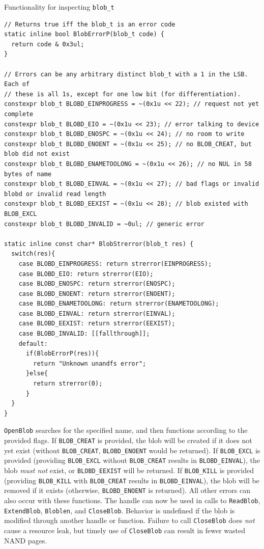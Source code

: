 \documentclass[letterpaper,10pt]{article}
\begin{document}
\begin{listing}[ht]
\caption{Functionality for inspecting {\texttt{blob\_t}}}
\begin{verbatim}
// Returns true iff the blob_t is an error code
static inline bool BlobErrorP(blob_t code) {
  return code & 0x3ul;
}

// Errors can be any arbitrary distinct blob_t with a 1 in the LSB. Each of
// these is all 1s, except for one low bit (for differentiation).
constexpr blob_t BLOBD_EINPROGRESS = ~(0x1u << 22); // request not yet complete
constexpr blob_t BLOBD_EIO = ~(0x1u << 23); // error talking to device
constexpr blob_t BLOBD_ENOSPC = ~(0x1u << 24); // no room to write
constexpr blob_t BLOBD_ENOENT = ~(0x1u << 25); // no BLOB_CREAT, but blob did not exist
constexpr blob_t BLOBD_ENAMETOOLONG = ~(0x1u << 26); // no NUL in 58 bytes of name
constexpr blob_t BLOBD_EINVAL = ~(0x1u << 27); // bad flags or invalid blobd or invalid read length
constexpr blob_t BLOBD_EEXIST = ~(0x1u << 28); // blob existed with BLOB_EXCL
constexpr blob_t BLOBD_INVALID = ~0ul; // generic error

static inline const char* BlobStrerror(blob_t res) {
  switch(res){
    case BLOBD_EINPROGRESS: return strerror(EINPROGRESS);
    case BLOBD_EIO: return strerror(EIO);
    case BLOBD_ENOSPC: return strerror(ENOSPC);
    case BLOBD_ENOENT: return strerror(ENOENT);
    case BLOBD_ENAMETOOLONG: return strerror(ENAMETOOLONG);
    case BLOBD_EINVAL: return strerror(EINVAL);
    case BLOBD_EEXIST: return strerror(EEXIST);
    case BLOBD_INVALID: [[fallthrough]];
    default:
      if(BlobErrorP(res)){
        return "Unknown unandfs error";
      }else{
        return strerror(0);
      }
  }
}
\end{verbatim}
\end{listing}

{\texttt{OpenBlob}} searches for the specified name, and then functions according
to the provided flags. If {\texttt{BLOB\_CREAT}} is provided, the blob will be
created if it does not yet exist (without \texttt{BLOB\_CREAT}, {\texttt{BLOBD\_ENOENT}} would
be returned). If {\texttt{BLOB\_EXCL}} is provided (providing {\texttt{BLOB\_EXCL}}
without {\texttt{BLOB\_CREAT}} results in {\texttt{BLOBD\_EINVAL}}), the
blob \textit{must not} exist, or \texttt{BLOBD\_EEXIST} will be returned. If
\texttt{BLOB\_KILL} is provided (providing \texttt{BLOB\_KILL} with \texttt{BLOB\_CREAT}
results in \texttt{BLOBD\_EINVAL}), the blob will be removed if it exists (otherwise,
\texttt{BLOBD\_ENOENT} is returned). All other errors can also occur with these
functions. The handle can now be used in calls to \texttt{ReadBlob}, \texttt{ExtendBlob},
\texttt{Bloblen}, and \texttt{CloseBlob}. Behavior is undefined if the blob
is modified through another handle or function. Failure to call \texttt{CloseBlob}
does \textit{not} cause a resource leak, but timely use of \texttt{CloseBlob}
can result in fewer wasted NAND pages.
\end{document}
